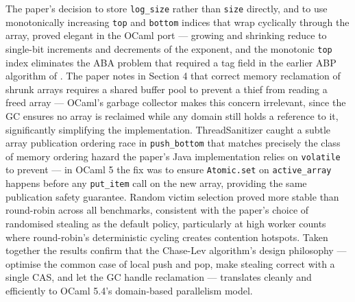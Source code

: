 \documentclass[11pt,a4paper]{article}
\begin{document}
The paper's decision to store \texttt{log\_size} rather than \texttt{size} directly,
and to use monotonically increasing \texttt{top} and \texttt{bottom} indices
that wrap cyclically through the array, proved elegant in the OCaml port —
growing and shrinking reduce to single-bit increments and decrements of the
exponent, and the monotonic \texttt{top} index eliminates the ABA problem that
required a tag field in the earlier ABP algorithm of \citet{arora1998thread}.
The paper notes in Section 4 that correct memory reclamation of shrunk arrays
requires a shared buffer pool to prevent a thief from reading a freed array —
OCaml's garbage collector makes this concern irrelevant, since the GC ensures
no array is reclaimed while any domain still holds a reference
to it, significantly simplifying the implementation. ThreadSanitizer caught a
subtle array publication ordering race in \texttt{push\_bottom} that matches
precisely the class of memory ordering hazard the paper's Java implementation
relies on \texttt{volatile} to prevent — in OCaml 5 the fix was to ensure
\texttt{Atomic.set} on \texttt{active\_array} happens before any \texttt{put\_item}
call on the new array, providing the same publication safety guarantee.
Random victim selection proved more stable than round-robin across all benchmarks,
consistent with the paper's choice of randomised stealing as the default policy,
particularly at high worker counts where round-robin's deterministic cycling
creates contention hotspots. Taken together the results confirm that the
Chase-Lev algorithm's design philosophy — optimise the common case of local push
and pop, make stealing correct with a single CAS, and let the GC handle
reclamation — translates cleanly and efficiently to OCaml 5.4's domain-based
parallelism model.
\end{document}
